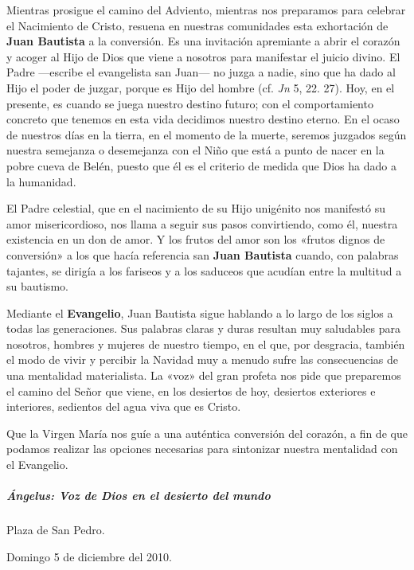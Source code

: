 \documentclass[]{article}
\let\oldsubparagraph\subparagraph
\renewcommand{\subparagraph}[1]{\oldsubparagraph{#1}\mbox{}}
\begin{document}
Mientras prosigue el camino del Adviento, mientras nos preparamos para
celebrar el Nacimiento de Cristo, resuena en nuestras comunidades esta
exhortación de \textbf{Juan Bautista} a la conversión. Es una invitación
apremiante a abrir el corazón y acoger al Hijo de Dios que viene a
nosotros para manifestar el juicio divino. El Padre ---escribe el
evangelista san Juan--- no juzga a nadie, sino que ha dado al Hijo el
poder de juzgar, porque es Hijo del hombre (cf. \emph{Jn} 5, 22. 27).
Hoy, en el presente, es cuando se juega nuestro destino futuro; con el
comportamiento concreto que tenemos en esta vida decidimos nuestro
destino eterno. En el ocaso de nuestros días en la tierra, en el momento
de la muerte, seremos juzgados según nuestra semejanza o desemejanza con
el Niño que está a punto de nacer en la pobre cueva de Belén, puesto que
él es el criterio de medida que Dios ha dado a la humanidad.

El Padre celestial, que en el nacimiento de su Hijo unigénito nos
manifestó su amor misericordioso, nos llama a seguir sus pasos
convirtiendo, como él, nuestra existencia en un don de amor. Y los
frutos del amor son los «frutos dignos de conversión» a los que hacía
referencia san \textbf{Juan Bautista} cuando, con palabras tajantes, se
dirigía a los fariseos y a los saduceos que acudían entre la multitud a
su bautismo.

Mediante el \textbf{Evangelio}, Juan Bautista sigue hablando a lo largo
de los siglos a todas las generaciones. Sus palabras claras y duras
resultan muy saludables para nosotros, hombres y mujeres de nuestro
tiempo, en el que, por desgracia, también el modo de vivir y percibir la
Navidad muy a menudo sufre las consecuencias de una mentalidad
materialista. La «voz» del gran profeta nos pide que preparemos el
camino del Señor que viene, en los desiertos de hoy, desiertos
exteriores e interiores, sedientos del agua viva que es Cristo.

Que la Virgen María nos guíe a una auténtica conversión del corazón, a
fin de que podamos realizar las opciones necesarias para sintonizar
nuestra mentalidad con el Evangelio.

\subparagraph{Ángelus: Voz de Dios en el desierto del
mundo}\label{uxe1ngelus-voz-de-dios-en-el-desierto-del-mundo}

Plaza de San Pedro. 

Domingo 5 de diciembre del 2010.
\end{document}
